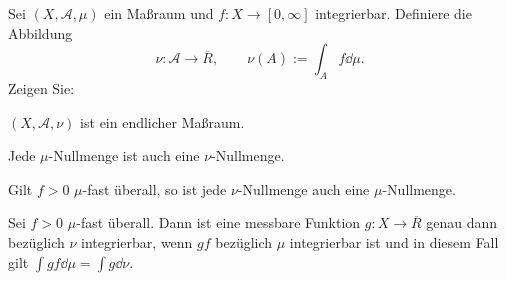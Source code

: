 \begin{Problem}
	Sei $(X,\mathcal{A},\mu)$ ein Maßraum und $f:X\to [0,\infty]$ integrierbar. Definiere die Abbildung
	\[
		\nu:\mathcal{A}\to \overline{R},\qquad \nu(A):=\int_A f\dd{\mu}
	.\] 
	Zeigen Sie:
	\begin{parts}
	\item $(X,\mathcal{A},\nu)$ ist ein endlicher Maßraum.
	\item Jede $\mu$-Nullmenge ist auch eine $\nu$-Nullmenge.
	\item Gilt $f>0$ $\mu$-fast überall, so ist jede $\nu$-Nullmenge auch eine $\mu$-Nullmenge.
	\item Sei $f>0$ $\mu$-fast überall. Dann ist eine messbare Funktion $g:X\to \overline{R}$ genau dann bezüglich $\nu$ integrierbar, wenn $gf$ bezüglich $\mu$ integrierbar ist und in diesem Fall gilt $\int gf\dd{\mu}=\int g\dd{\nu}$. 
	\end{parts}
\end{Problem}
